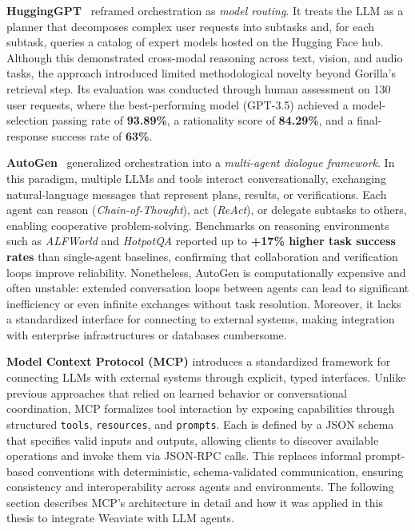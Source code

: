 \textbf{HuggingGPT}~\cite{shen2023hugginggpt} reframed orchestration as \emph{model routing}.  
It treats the LLM as a planner that decomposes complex user requests into subtasks and, for each subtask, queries a catalog of expert models hosted on the Hugging Face hub.  
Although this demonstrated cross-modal reasoning across text, vision, and audio tasks, the approach introduced limited methodological novelty beyond Gorilla’s retrieval step.  
Its evaluation was conducted through human assessment on 130 user requests, where the best-performing model (GPT-3.5) achieved a model-selection passing rate of \textbf{93.89\%}, a rationality score of \textbf{84.29\%}, and a final-response success rate of \textbf{63\%}.



\textbf{AutoGen}~\cite{wu2023autogen} generalized orchestration into a \emph{multi-agent dialogue framework}.  
In this paradigm, multiple LLMs and tools interact conversationally, exchanging natural-language messages that represent plans, results, or verifications.  
Each agent can reason (\emph{Chain-of-Thought}), act (\emph{ReAct}), or delegate subtasks to others, enabling cooperative problem-solving.  
Benchmarks on reasoning environments such as \textit{ALFWorld} and \textit{HotpotQA} reported up to \textbf{+17\% higher task success rates} than single-agent baselines, confirming that collaboration and verification loops improve reliability.  
Nonetheless, AutoGen is computationally expensive and often unstable: extended conversation loops between agents can lead to significant inefficiency or even infinite exchanges without task resolution.  
Moreover, it lacks a standardized interface for connecting to external systems, making integration with enterprise infrastructures or databases cumbersome.

\textbf{Model Context Protocol (MCP)} introduces a standardized framework for connecting LLMs with external systems through explicit, typed interfaces.  
Unlike previous approaches that relied on learned behavior or conversational coordination, MCP formalizes tool interaction by exposing capabilities through structured \texttt{tools}, \texttt{resources}, and \texttt{prompts}.  
Each is defined by a JSON schema that specifies valid inputs and outputs, allowing clients to discover available operations and invoke them via JSON-RPC calls.  
This replaces informal prompt-based conventions with deterministic, schema-validated communication, ensuring consistency and interoperability across agents and environments.  
The following section describes MCP’s architecture in detail and how it was applied in this thesis to integrate Weaviate with LLM agents.


